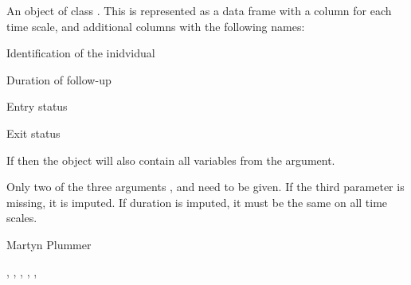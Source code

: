 \begin{Value}
An object of class . This is represented as a data frame
with a column for each time scale, and additional columns with the
following names:
\begin{ldescription}
\item[\code{lex.id}] Identification of the inidvidual
\item[\code{lex.deltat}] Duration of follow-up
\item[\code{lex.status1}] Entry status
\item[\code{lex.status2}] Exit status
\end{ldescription}

If  then the  object will also contain
all variables from the  argument.
\end{Value}
\begin{Note}\relax
Only two of the three arguments ,  and
 need to be given.  If the third parameter is missing,
it is imputed. If duration is imputed, it must be the same on
all time scales.
\end{Note}
\begin{Author}\relax
Martyn Plummer
\end{Author}
\begin{SeeAlso}\relax
{}, ,
, ,
,
\end{SeeAlso}

